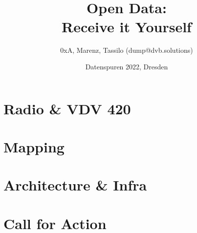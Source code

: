 \documentclass[aspectratio=169]{beamer}
\title{Open Data: \\ Receive it Yourself}
\date[ISPN ’80]{Datenspuren 2022, Dresden}
\author[]{0xA, Marenz, Tassilo (dump@dvb.solutions)}
\begin{document}
\begin{frame}\titlepage
\end{frame}

\section{Radio \& VDV 420}





\section{Mapping}





\section{Architecture \& Infra }





\section{Call for Action}

\end{document}
